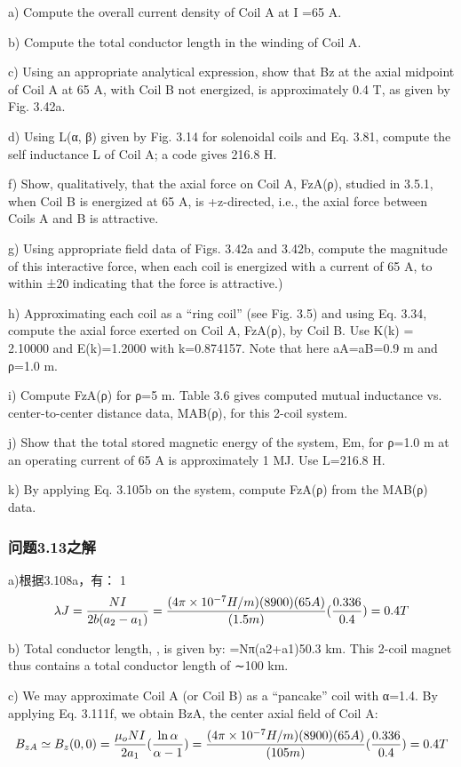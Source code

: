a) Compute the overall current density of Coil A at I =65 A.

b) Compute the total conductor length in the winding of Coil A.

c) Using an appropriate analytical expression, show that Bz at the axial midpoint of Coil A at 65 A, with Coil B not energized, is approximately 0.4 T, as
given by Fig. 3.42a.

d) Using L(α, β) given by Fig. 3.14 for solenoidal coils and Eq. 3.81, compute
the self inductance L of Coil A; a code gives 216.8 H.

f) Show, qualitatively, that the axial force on Coil A, FzA(ρ), studied in 3.5.1,
when Coil B is energized at 65 A, is +z-directed, i.e., the axial force between
Coils A and B is attractive.

g) Using appropriate field data of Figs. 3.42a and 3.42b, compute the magnitude
of this interactive force, when each coil is energized with a current of 65 A,
to within ±20%
indicating that the force is attractive.)

h) Approximating each coil as a “ring coil” (see Fig. 3.5) and using Eq. 3.34,
compute the axial force exerted on Coil A, FzA(ρ), by Coil B. Use K(k) =
2.10000 and E(k)=1.2000 with k=0.874157. Note that here aA=aB=0.9 m
and ρ=1.0 m.

i) Compute FzA(ρ) for ρ=5 m.
Table 3.6 gives computed mutual inductance vs. center-to-center distance data,
MAB(ρ), for this 2-coil system.

j) Show that the total stored magnetic energy of the system, Em, for ρ=1.0 m
at an operating current of 65 A is approximately 1 MJ. Use L=216.8 H.

k) By applying Eq. 3.105b on the system, compute FzA(ρ) from the MAB(ρ) data.


\subsubsection{问题3.13之解}
a)根据3.108a，有：
1$$
\lambda J=\frac{NI}{2b(a_{2}-a_{1})}\\%
=\frac{(4\pi\times10^{-7}H/m)(8900)(65A)}{(1.5m)}(\frac{0.336}{0.4})=0.4T\\
$$

b) Total conductor length, , is given by: =Nπ(a2+a1)50.3 km. This 2-coil
magnet thus contains a total conductor length of ∼100 km.

c) We may approximate Coil A (or Coil B) as a “pancake” coil with α=1.4. By
applying Eq. 3.111f, we obtain BzA, the center axial field of Coil A:
$$
B_{zA}\simeq B_{z}(0,0)=\frac{\mu_{o}NI}{2a_{1}}(\frac{\ln\alpha}{\alpha-1})\\%
=\frac{(4\pi\times10^{-7}H/m)(8900)(65A)}{(105m)}(\frac{0.336}{0.4})=0.4T\\
$$

